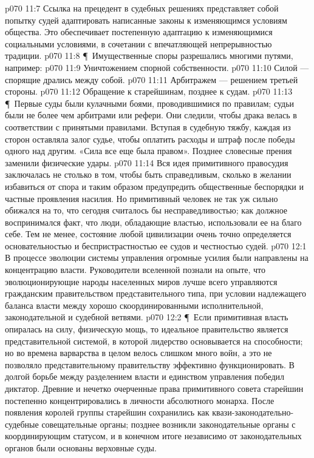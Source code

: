\vs p070 11:7 Ссылка на прецедент в судебных решениях представляет собой попытку судей адаптировать написанные законы к изменяющимся условиям общества. Это обеспечивает постепенную адаптацию к изменяющимися социальными условиями, в сочетании с впечатляющей непрерывностью традиции.
\vs p070 11:8 \P\ Имущественные споры разрешались многими путями, например:
\vs p070 11:9 \bibnobreakspace Уничтожением спорной собственности.
\vs p070 11:10 \bibnobreakspace Силой --- спорящие дрались между собой.
\vs p070 11:11 \bibnobreakspace Арбитражем --- решением третьей стороны.
\vs p070 11:12 \bibnobreakspace Обращение к старейшинам, позднее к судам.
\vs p070 11:13 \P\ Первые суды были кулачными боями, проводившимися по правилам; судьи были не более чем арбитрами или рефери. Они следили, чтобы драка велась в соответствии с принятыми правилами. Вступая в судебную тяжбу, каждая из сторон оставляла залог судье, чтобы оплатить расходы и штраф после победы одного над другим. «Сила все еще была правом». Позднее словесные прения заменили физические удары.
\vs p070 11:14 Вся идея примитивного правосудия заключалась не столько в том, чтобы быть справедливым, сколько в желании избавиться от спора и таким образом предупредить общественные беспорядки и частные проявления насилия. Но примитивный человек не так уж сильно обижался на то, что сегодня считалось бы несправедливостью; как должное воспринимался факт, что люди, обладающие властью, использовали ее на благо себе. Тем не менее, состояние любой цивилизации очень точно определяется основательностью и беспристрастностью ее судов и честностью судей.
\vs p070 12:1 В процессе эволюции системы управления огромные усилия были направлены на концентрацию власти. Руководители вселенной познали на опыте, что эволюционирующие народы населенных миров лучше всего управляются гражданским правительством представительного типа, при условии надлежащего баланса власти между хорошо скоординированными исполнительной, законодательной и судебной ветвями.
\vs p070 12:2 \P\ Если примитивная власть опиралась на силу, физическую мощь, то идеальное правительство является представительной системой, в которой лидерство основывается на способности; но во времена варварства в целом велось слишком много войн, а это не позволяло представительному правительству эффективно функционировать. В долгой борьбе между разделением власти и единством управления победил диктатор. Древние и нечетко очерченные права примитивного совета старейшин постепенно концентрировались в личности абсолютного монарха. После появления королей группы старейшин сохранились как квази\hyp{}законодательно\hyp{}судебные совещательные органы; позднее возникли законодательные органы с координирующим статусом, и в конечном итоге независимо от законодательных органов были основаны верховные суды.
